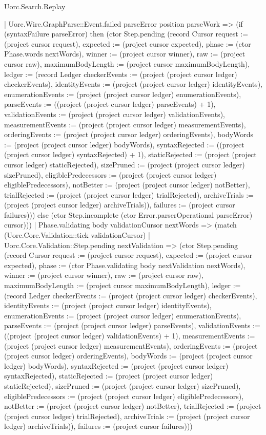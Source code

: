 \begin{lexlean}{Uorc.Search.Replay}
\begin{semanticmodule}
{      | Uorc.Wire.GraphParse::Event.failed parseError position parseWork => (if (syntaxFailure parseError) then (ctor Step.pending (record Cursor {request := (project cursor request), expected := (project cursor expected), phase := (ctor Phase.words nextWords), winner := (project cursor winner), raw := (project cursor raw), maximumBodyLength := (project cursor maximumBodyLength), ledger := (record Ledger {checkerEvents := (project (project cursor ledger) checkerEvents), identityEvents := (project (project cursor ledger) identityEvents), enumerationEvents := (project (project cursor ledger) enumerationEvents), parseEvents := ((project (project cursor ledger) parseEvents) + 1), validationEvents := (project (project cursor ledger) validationEvents), measurementEvents := (project (project cursor ledger) measurementEvents), orderingEvents := (project (project cursor ledger) orderingEvents), bodyWords := (project (project cursor ledger) bodyWords), syntaxRejected := ((project (project cursor ledger) syntaxRejected) + 1), staticRejected := (project (project cursor ledger) staticRejected), sizePruned := (project (project cursor ledger) sizePruned), eligiblePredecessors := (project (project cursor ledger) eligiblePredecessors), notBetter := (project (project cursor ledger) notBetter), trialRejected := (project (project cursor ledger) trialRejected), archiveTrials := (project (project cursor ledger) archiveTrials)}), failures := (project cursor failures)})) else (ctor Step.incomplete (ctor Error.parserOperational parseError) cursor)))
    | Phase.validating body validationCursor nextWords => (match (Uorc.Core.Validation::tick validationCursor)
      | Uorc.Core.Validation::Step.pending nextValidation => (ctor Step.pending (record Cursor {request := (project cursor request), expected := (project cursor expected), phase := (ctor Phase.validating body nextValidation nextWords), winner := (project cursor winner), raw := (project cursor raw), maximumBodyLength := (project cursor maximumBodyLength), ledger := (record Ledger {checkerEvents := (project (project cursor ledger) checkerEvents), identityEvents := (project (project cursor ledger) identityEvents), enumerationEvents := (project (project cursor ledger) enumerationEvents), parseEvents := (project (project cursor ledger) parseEvents), validationEvents := ((project (project cursor ledger) validationEvents) + 1), measurementEvents := (project (project cursor ledger) measurementEvents), orderingEvents := (project (project cursor ledger) orderingEvents), bodyWords := (project (project cursor ledger) bodyWords), syntaxRejected := (project (project cursor ledger) syntaxRejected), staticRejected := (project (project cursor ledger) staticRejected), sizePruned := (project (project cursor ledger) sizePruned), eligiblePredecessors := (project (project cursor ledger) eligiblePredecessors), notBetter := (project (project cursor ledger) notBetter), trialRejected := (project (project cursor ledger) trialRejected), archiveTrials := (project (project cursor ledger) archiveTrials)}), failures := (project cursor failures)}))
}
\end{semanticmodule}
\end{lexlean}
